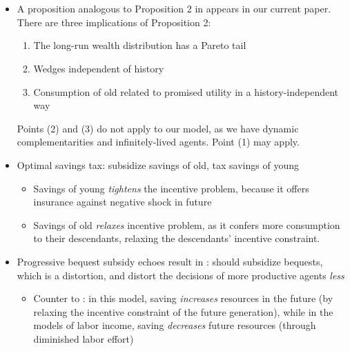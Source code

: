 \documentclass[11pt]{article}
\begin{document}
\section{\cite{shourideh2014optimal}}
\begin{itemize}
    \item A proposition analogous to Proposition 2 in \cite{shourideh2014optimal} appears in our current paper. There are three implications of Proposition 2: 
    \begin{enumerate}
        \item The long-run wealth distribution has a Pareto tail
        \item Wedges independent of history
        \item Consumption of old related to promised utility in a history-independent way
    \end{enumerate}
    Points (2) and (3) do not apply to our model, as we have dynamic complementarities and infinitely-lived agents. Point (1) may apply. 
    \item Optimal savings tax: subsidize savings of old, tax savings of young 
    \begin{itemize}
        \item Savings of young \textit{tightens} the incentive problem, because it offers insurance against negative shock in future 
        \item Savings of old \textit{relaxes} incentive problem, as it confers more consumption to their descendants, relaxing the descendants' incentive constraint.
    \end{itemize} 
    \item Progressive bequest subsidy echoes result in \cite{farhi2010progressive}: should subsidize bequests, which is a distortion, and distort the decisions of more productive agents \textit{less}
    \begin{itemize}
        \item Counter to \cite{golosov2003optimal}: in this model, saving \textit{increases} resources in the future (by relaxing the incentive constraint of the future generation), while in the models of labor income, saving \textit{decreases} future resources (through diminished labor effort)
    \end{itemize}
\end{itemize}
\end{document}
